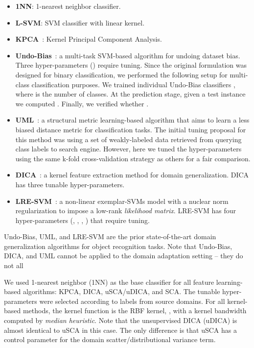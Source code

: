 \documentclass[10pt,journal,compsoc]{IEEEtran}
\begin{document}
\begin{itemize}[leftmargin=*]
 \item \textbf{1NN}: 1-nearest neighbor classifier.
 \item \textbf{L-SVM}: SVM classifier with linear kernel.
 \item \textbf{KPCA}~\cite{Scholkopf1998}: Kernel Principal Component Analysis.
 \item \textbf{Undo-Bias}~\cite{Khosla2012}: a multi-task SVM-based algorithm for undoing dataset bias. Three hyper-parameters () require tuning. 
 Since the original formulation was designed for binary classification, we performed the following setup for multi-class classification purposes.
 We trained  individual Undo-Bias classifiers , where  is the number of classes.
 At the prediction stage, given a test instance  we computed .
 Finally, we verified whether .
 \item \textbf{UML}~\cite{Fang2013}: a structural metric learning-based algorithm that aims to learn a less biased distance metric for classification tasks.
 The initial tuning proposal for this method was using a set of weakly-labeled data retrieved from querying class labels to search engine. However, here we tuned the hyper-parameters using the same k-fold cross-validation strategy as others for a fair comparison.
 \item \textbf{DICA}~\cite{Muandet2013}: a kernel feature extraction method for domain generalization. DICA has three tunable hyper-parameters.
 \item \textbf{LRE-SVM}~\cite{Xu2014}: a non-linear exemplar-SVMs model with a nuclear norm regularization to impose a low-rank \emph{likelihood matrix}. 
 LRE-SVM has four hyper-parameters (, , , ) that require tuning.
\end{itemize}
Undo-Bias, UML, and LRE-SVM are the prior state-of-the-art domain generalization algorithms for object recognition tasks.
Note that Undo-Bias, DICA, and UML cannot be applied to the domain adaptation setting -- they do not all

We used 1-nearest neighbor (1NN) as the base classifier for all feature learning-based algorithms: KPCA, DICA, uSCA/uDICA, and SCA.
The tunable hyper-parameters were selected according to labels from source domains.
For all kernel-based methods, the kernel function is the RBF kernel, , with a kernel bandwidth  computed by \emph{median heuristic}.
Note that the unsupervised DICA (uDICA) is almost identical to uSCA in this case. The only difference is that uSCA has a control parameter  for the domain scatter/distributional variance term.
\end{document}
